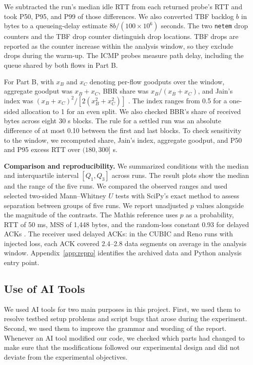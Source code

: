 \documentclass[11pt,a4paper]{article}
\begin{document}
We subtracted the run's median idle RTT from each returned probe's RTT and took P50, P95, and P99 of those differences. We also converted TBF backlog $b$ in bytes to a queueing-delay estimate $8b/(100\times 10^6)$ seconds. The two \texttt{netem} drop counters and the TBF drop counter distinguish drop locations. TBF drops are reported as the counter increase within the analysis window, so they exclude drops during the warm-up. The ICMP probes measure path delay, including the queue shared by both flows in Part B.

For Part B, with $x_B$ and $x_C$ denoting per-flow goodputs over the window, aggregate goodput was $x_B+x_C$, BBR share was $x_B/(x_B+x_C)$, and Jain's index was $(x_B+x_C)^2/[2(x_B^2+x_C^2)]$ \cite{jain1984}. The index ranges from 0.5 for a one-sided allocation to 1 for an even split. We also checked BBR's share of received bytes across eight 30 s blocks. The rule for a settled run was an absolute difference of at most 0.10 between the first and last blocks. To check sensitivity to the window, we recomputed share, Jain's index, aggregate goodput, and P50 and P95 excess RTT over $(180,300]$ s.

\textbf{Comparison and reproducibility.} We summarized conditions with the median and interquartile interval $[Q_1,Q_3]$ across runs. The result plots show the median and the range of the five runs. We compared the observed ranges and used selected two-sided Mann--Whitney $U$ tests with SciPy's exact method to assess separation between groups of five runs. We report unadjusted $p$ values alongside the magnitude of the contrasts. The Mathis reference uses $p$ as a probability, RTT of 50 ms, MSS of 1,448 bytes, and the random-loss constant 0.93 for delayed ACKs \cite{mathis1997}. The receiver used delayed ACKs: in the CUBIC and Reno runs with injected loss, each ACK covered 2.4--2.8 data segments on average in the analysis window. Appendix~\ref{app:repro} identifies the archived data and Python analysis entry point.

\subsection{Use of AI Tools}
We used AI tools for two main purposes in this project. First, we used them to resolve testbed setup problems and script bugs that arose during the experiment. Second, we used them to improve the grammar and wording of the report. Whenever an AI tool modified our code, we checked which parts had changed to make sure that the modifications followed our experimental design and did not deviate from the experimental objectives.
\end{document}
